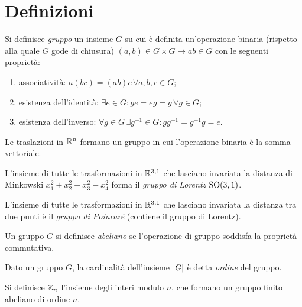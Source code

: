 
\section{Definizioni}

\begin{definition}
	Si definisce \textit{gruppo} un insieme $ G $ su cui è definita un'operazione binaria (rispetto alla quale $ G $ gode di chiusura) $ \left( a,b \right) \in G \times G \mapsto ab \in G $ con le seguenti proprietà:
	\begin{enumerate}
		\item associatività: $ a(bc) = (ab)c \,\forall a,b,c \in G $;
		\item esistenza dell'identità: $ \exists e \in G : ge = eg = g \,\forall g \in G $;
		\item esistenza dell'inverso: $ \forall g \in G \,\exists g^{-1} \in G : g g^{-1} = g^{-1} g = e $.
	\end{enumerate}
\end{definition}

\begin{example}
	Le traslazioni in $ \mathbb{R}^n $ formano un gruppo in cui l'operazione binaria è la somma vettoriale.
\end{example}
\begin{example}
	L'insieme di tutte le trasformazioni in $ \mathbb{R}^{3,1} $ che lasciano invariata la distanza di Minkowski $ x_1^2 + x_2^2 + x_3^2 - x_4^2 $ forma il \textit{gruppo di Lorentz} $ \mathrm{SO}(3,1) $.
\end{example}
\begin{example}
	L'insieme di tutte le trasformazioni in $ \mathbb{R}^{3,1} $ che lasciano invariata la distanza tra due punti è il \textit{gruppo di Poincaré} (contiene il gruppo di Lorentz).
\end{example}

\begin{definition}
	Un gruppo $ G $ si definisce \textit{abeliano} se l'operazione di gruppo soddisfa la proprietà commutativa.
\end{definition}

\begin{definition}
	Dato un gruppo $ G $, la cardinalità dell'insieme $ \left\lvert G\right\rvert $ è detta \textit{ordine} del gruppo.
\end{definition}

\begin{example}
	Si definisce $ \mathbb{Z}_n $ l'insieme degli interi modulo $ n $, che formano un gruppo finito abeliano di ordine $ n $.
\end{example}

